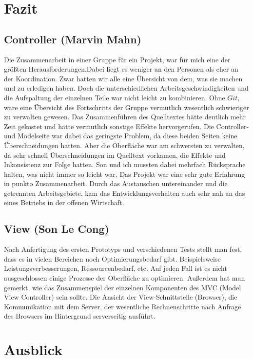 \documentclass[a4paper,12pt]{scrreprt}
\begin{document}
	\section{Fazit}
	\subsection{Controller (Marvin Mahn)}
	Die Zusammenarbeit in einer Gruppe f\"ur ein Projekt, war f\"ur mich eine der gr\"o{\ss}ten
	Herausforderungen.Dabei liegt es weniger an den Personen als eher an der Koordination. Zwar
	hatten wir alle eine \"Ubersicht von dem, was sie machen und zu erledigen haben. Doch die
	unterschiedlichen Arbeitsgeschwindigkeiten und die Aufspaltung der einzelnen Teile war nicht
	leicht zu kombinieren. Ohne $Git$, w\"are eine \"Ubersicht des Fortschritts der Gruppe vermutlich
	wesentlich schwieriger zu verwalten gewesen. Das Zusammenf\"uhren des Quelltextes h\"atte
	deutlich mehr Zeit gekostet und h\"atte vermutlich sonstige Effekte hervorgerufen. Die Controller-
	und Modelseite war dabei das geringste Problem, da diese beiden Seiten keine \"Uberschneidungen
	hatten. Aber die Oberfl\"ache war am schwersten zu verwalten, da sehr schnell \"Uberschneidungen
	im Quelltext vorkamen, die Effekte und Inkonsistenz zur Folge hatten. Son und ich mussten dabei
	mehrfach R\"ucksprache halten, was nicht immer so leicht war. Das Projekt war eine sehr gute
	Erfahrung in punkto Zusammenarbeit. Durch das Austauschen untereinander und die getrennten
	Arbeitsgebiete, kam das Entwicklungsverhalten auch sehr nah an das eines Betriebs in der offenen
	Wirtschaft.
	
	\subsection{View (Son Le Cong)}
	Nach Anfertigung des ersten Prototyps und verschiedenen Tests stellt man fest, dass es in vielen Bereichen
	noch Optimierungsbedarf gibt. Beispielsweise Leistungsverbesserungen, Ressourcenbedarf, etc.
	Auf jeden Fall ist es nicht ausgeschlossen einige Prozesse der Oberfl\"ache zu optimieren.
	Au{\ss}erdem hat man gemerkt, wie das Zusammenspiel der einzelnen Komponenten des MVC (Model View Controller) sein sollte.
	Die Ansicht der View-Schnittstelle (Browser), die Kommunikation mit dem Server, der wesentliche Rechnenschritte
	nach Anfrage des Browsers im Hintergrund serverseitig ausf\"uhrt.

	\section{Ausblick}
\end{document}
